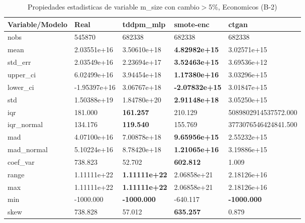 \begin{table}[H]
\centering
\fontsize{8}{14}\selectfont
\caption{Propiedades estadisticas de variable m\_size con cambio\ensuremath{>}5\%, Economicos (B-2)}
\label{table-stats-economicos-b-2-m_size-short}
\begin{tabular}{|l|m{10em}|m{10em}|m{10em}|m{10em}|}
\hline
 \rowcolor[gray]{0.8}
Variable/Modelo & Real & tddpm\_mlp & smote-enc & ctgan \\
\hline nobs & 545870 & 682338 & 682338 & 682338 \\
\hline mean & 2.03551e+16 & \cellcolor[rgb]{0.9, 0.54, 0.52} 3.50610e+18 & \bfseries 4.82982e+15 & 3.02571e+15 \\
\hline std\_err & 2.03549e+16 & \cellcolor[rgb]{0.9, 0.54, 0.52} 2.23694e+17 & \bfseries 3.52463e+15 & 3.69536e+12 \\
\hline upper\_ci & 6.02499e+16 & \cellcolor[rgb]{0.9, 0.54, 0.52} 3.94454e+18 & \bfseries 1.17380e+16 & 3.03296e+15 \\
\hline lower\_ci & -1.95397e+16 & \cellcolor[rgb]{0.9, 0.54, 0.52} 3.06767e+18 & \bfseries -2.07832e+15 & 3.01847e+15 \\
\hline std & 1.50388e+19 & \cellcolor[rgb]{0.9, 0.54, 0.52} 1.84780e+20 & \bfseries 2.91148e+18 & 3.05250e+15 \\
\hline iqr & 181.000 & \bfseries 161.257 & 210.129 & \cellcolor[rgb]{0.9, 0.54, 0.52} 5089802914537572.000 \\
\hline iqr\_normal & 134.176 & \bfseries 119.540 & 155.769 & \cellcolor[rgb]{0.9, 0.54, 0.52} 3773076546424841.500 \\
\hline mad & 4.07100e+16 & \cellcolor[rgb]{0.9, 0.54, 0.52} 7.00878e+18 & \bfseries 9.65956e+15 & 2.55232e+15 \\
\hline mad\_normal & 5.10224e+16 & \cellcolor[rgb]{0.9, 0.54, 0.52} 8.78420e+18 & \bfseries 1.21065e+16 & 3.19886e+15 \\
\hline coef\_var & 738.823 & 52.702 & \bfseries 602.812 & \cellcolor[rgb]{0.9, 0.54, 0.52} 1.009 \\
\hline range & 1.11111e+22 & \bfseries 1.11111e+22 & 2.06858e+21 & \cellcolor[rgb]{0.9, 0.54, 0.52} 2.18126e+16 \\
\hline max & 1.11111e+22 & \bfseries 1.11111e+22 & 2.06858e+21 & \cellcolor[rgb]{0.9, 0.54, 0.52} 2.18126e+16 \\
\hline min & -1000.000 & \bfseries -1000.000 & \cellcolor[rgb]{0.9, 0.54, 0.52} -640.117 & \bfseries -1000.000 \\
\hline skew & 738.828 & 57.012 & \bfseries 635.257 & \cellcolor[rgb]{0.9, 0.54, 0.52} 0.879 \\

\end{tabular}
\end{table}

